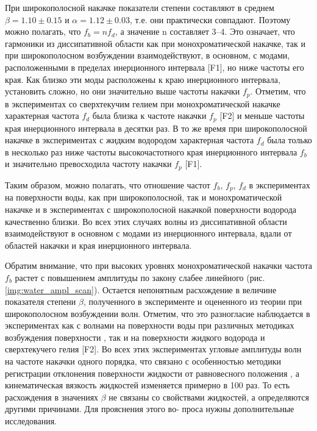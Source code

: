 При широкополосной накачке показатели степени составляют в среднем $\beta = 1.10 \pm 0.15$ и $\alpha = 1.12 \pm 0.03$, т.е. они практически совпадают. Поэтому можно полагать, что $f_b = n f_d$, а значение n составляет 3–4. Это означает, что гармоники из диссипативной области как при монохроматической накачке, так и при широкополосном возбуждении взаимодействуют, в основном, с модами, расположенными в пределах инерционного интервала [F1], но ниже частоты его края. Как близко эти моды расположены к краю инерционного интервала, установить сложно, но они значительно выше частоты накачки $f_p$.
Отметим, что в экспериментах со сверхтекучим гелием при монохроматической накачке характерная частота $f_d$ была близка к частоте накачки $f_p$ [F2] и меньше частоты края инерционного интервала в десятки раз. В то же время при широкополосной накачке в экспериментах с жидким водородом характерная частота $f_d$ была только в несколько раз ниже частоты высокочастотного края инерционного интервала $f_b$ и значительно превосходила частоту накачки $f_p$ [F1].

Таким образом, можно полагать, что отношение частот $f_b$, $f_p$, $f_d$ в экспериментах на поверхности воды, как при широкополосной, так и монохроматической накачке и в экспериментах с широкополосной накачкой поверхности водорода качественно близки. Во всех этих случаях волны из диссипативной области взаимодействуют в основном с модами из инерционного интервала, вдали от областей накачки и края инерционного интервала.

Обратим внимание, что при высоких уровнях монохроматической накачки частота $f_b$ растет с повышением амплитуды по закону слабее линейного (рис. \ref{img:water_ampl_scan}). Остается непонятным расхождение в величине показателя степени $\beta$, полученного в эксперименте и оцененного из теории при широкополосном возбуждении волн. Отметим, что это разногласие наблюдается в экспериментах как с волнами на поверхности воды при различных методиках возбуждения поверхности \cite{Brazhnikov_EPL}, так и на поверхности жидкого водорода \cite{Brazhnikov_liq_hydr} и сверхтекучего гелия [F2]. Во всех этих экспериментах угловые амплитуды волн на частоте накачки одного порядка, что связано с особенностью методики регистрации отклонения поверхности жидкости от равновесного положения \cite{Brazhnikov_IET}, а кинематическая вязкость жидкостей изменяется примерно в 100 раз. То есть расхождения в значениях $\beta$ не связаны со свойствами жидкостей, а определяются другими причинами. Для прояснения этого во- проса нужны дополнительные исследования.

